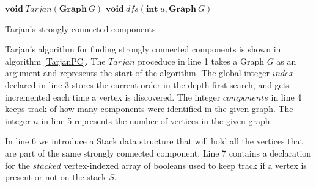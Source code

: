 \documentclass{l4proj}
\begin{document}

\begin{algorithm}[H]
\DontPrintSemicolon
\nl $\textbf{void} ~\mathit{Tarjan}(\textbf{Graph}~G)$ \;
\nl {}
\;
\nl $\textbf{void} ~\mathit{dfs}(\textbf{int}~u, \textbf{Graph}~G)$ \;
\nl {}
\caption{Tarjan's strongly connected components}
\label{TarjanPC}
\end{algorithm}

\noindent Tarjan's algorithm for finding strongly connected components is shown in algorithm \ref{TarjanPC}. The $Tarjan$ proceduce in line 1 takes a Graph $G$ as an argument and represents the start of the algorithm. The global integer $index$ declared in line 3 stores the current order in the depth-first search, and gets incremented each time a vertex is discovered. The integer $components$ in line 4 keeps track of how many components were identified in the given graph. The integer $n$ in line 5 represents the number of vertices in the given graph.

\noindent In line 6 we introduce a Stack data structure that will hold all the vertices that are part of the same strongly connected component. Line 7 contains a declaration for the $stacked$ vertex-indexed array of booleans used to keep track if a vertex is present or not on the stack $S$.
\end{document}
